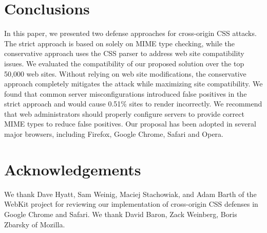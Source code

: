 \documentclass{acm_proc_article-sp}
\begin{document}
\section{Conclusions} \label{sec:conclusion}
In this paper, we presented two defense approaches for cross-origin CSS attacks. The strict approach is based on solely on MIME type
checking, while the conservative approach uses the CSS parser to
address web site compatibility issues. We evaluated the compatibility of our
proposed solution over the top 50,000 web sites. Without relying on web site
modifications, the conservative approach completely mitigates the attack while
maximizing site compatibility. We found that common server misconfigurations
introduced false positives in the strict approach and would cause 0.51\%
sites to render incorrectly. We recommend that web administrators should
properly configure servers to provide correct MIME types to reduce false
positives. Our proposal has been adopted in several major browsers, including
Firefox, Google Chrome, Safari and Opera.

\section*{Acknowledgements}

We thank Dave Hyatt, Sam Weinig, Maciej Stachowiak, and Adam Barth of the
WebKit project for reviewing our implementation of cross-origin CSS defenses in Google Chrome and Safari. We thank David Baron, Zack Weinberg, Boris Zbarsky of Mozilla.



\end{document}
